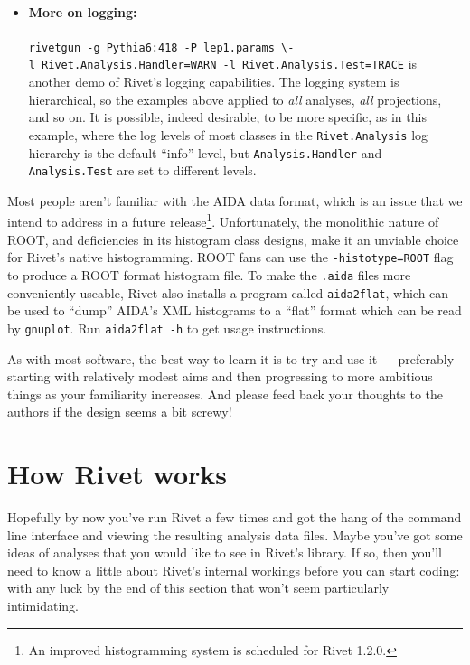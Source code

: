 \documentclass{JHEP3}
\newcommand{\kbd}[1]{\texttt{#1}\xspace}
\newcommand{\cmdbreak}{\textbackslash\newline}
\begin{document}
\begin{itemize}
\item \paragraph{More on logging:}{\kbd{rivetgun -g~Pythia6:418 -P~lep1.params
      \cmdbreak -l~Rivet.Analysis.Handler=WARN -l~Rivet.Analysis.Test=TRACE}
    is another demo of Rivet's logging capabilities. The logging system is
    hierarchical, so the examples above applied to \emph{all} analyses,
    \emph{all} projections, and so on. It is possible, indeed desirable, to be
    more specific, as in this example, where the log levels of most classes in
    the \kbd{Rivet.Analysis} log hierarchy is the default ``info'' level, but
    \kbd{Analysis.Handler} and \kbd{Analysis.Test} are set to different levels.}
\end{itemize}

Most people aren't familiar with the AIDA data format, which is an issue that we
intend to address in a future release\footnote{An improved histogramming system
  is scheduled for Rivet 1.2.0.}. Unfortunately, the monolithic nature of ROOT,
and deficiencies in its histogram class designs, make it an unviable choice for
Rivet's native histogramming. ROOT fans can use the \kbd{-\-histotype=ROOT} flag
to produce a ROOT format histogram file. To make the \kbd{.aida} files more
conveniently useable, Rivet also installs a program called \kbd{aida2flat},
which can be used to ``dump'' AIDA's XML histograms to a ``flat'' format which
can be read by \kbd{gnuplot}. Run \kbd{aida2flat -h} to get usage instructions.

As with most software, the best way to learn it is to try and use it ---
preferably starting with relatively modest aims and then progressing to more
ambitious things as your familiarity increases. And please feed back your
thoughts to the authors if the design seems a bit screwy!



\section{How Rivet works}
Hopefully by now you've run Rivet a few times and got the hang of the command
line interface and viewing the resulting analysis data files. Maybe you've got
some ideas of analyses that you would like to see in Rivet's library. If so,
then you'll need to know a little about Rivet's internal workings before you can
start coding: with any luck by the end of this section that won't seem
particularly intimidating.
\end{document}
